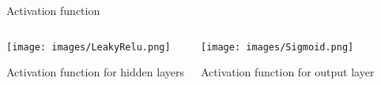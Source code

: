 \begin{frame}{Activation function}
   \begin{columns}[c]
        \begin{center}
            \texttt{[image: images/LeakyRelu.png]}

            Activation function for hidden layers
        \end{center}

        \begin{center}
            \texttt{[image: images/Sigmoid.png]}

            Activation function for output layer
        \end{center}
  \end{columns}
\end{frame}
